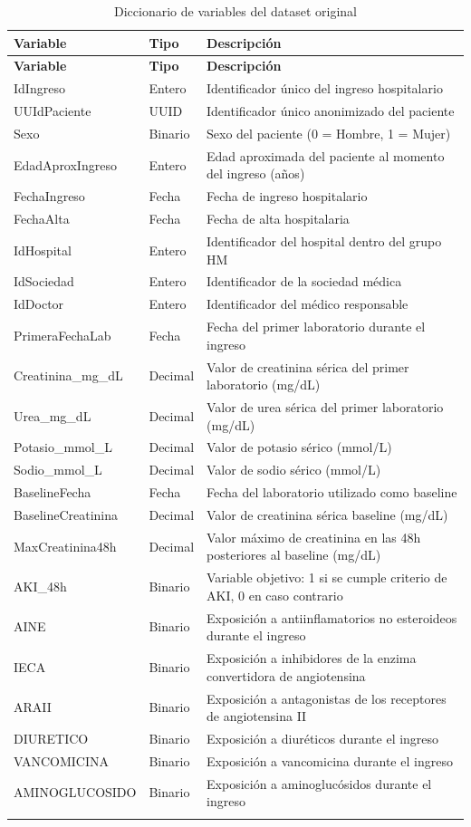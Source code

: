 \documentclass[12pt, a4paper, oneside]{report}
\begin{document}
\begin{longtable}{p{4cm}p{2.5cm}p{7cm}}
\hline
\textbf{Variable} & \textbf{Tipo} & \textbf{Descripción} \\
\hline
\endfirsthead
\hline
\textbf{Variable} & \textbf{Tipo} & \textbf{Descripción} \\
\hline
\endhead
\hline
\endfoot
IdIngreso & Entero & Identificador único del ingreso hospitalario \\
UUIdPaciente & UUID & Identificador único anonimizado del paciente \\
Sexo & Binario & Sexo del paciente (0 = Hombre, 1 = Mujer) \\
EdadAproxIngreso & Entero & Edad aproximada del paciente al momento del ingreso (años) \\
FechaIngreso & Fecha & Fecha de ingreso hospitalario \\
FechaAlta & Fecha & Fecha de alta hospitalaria \\
IdHospital & Entero & Identificador del hospital dentro del grupo HM \\
IdSociedad & Entero & Identificador de la sociedad médica \\
IdDoctor & Entero & Identificador del médico responsable \\
PrimeraFechaLab & Fecha & Fecha del primer laboratorio durante el ingreso \\
Creatinina\_mg\_dL & Decimal & Valor de creatinina sérica del primer laboratorio (mg/dL) \\
Urea\_mg\_dL & Decimal & Valor de urea sérica del primer laboratorio (mg/dL) \\
Potasio\_mmol\_L & Decimal & Valor de potasio sérico (mmol/L) \\
Sodio\_mmol\_L & Decimal & Valor de sodio sérico (mmol/L) \\
BaselineFecha & Fecha & Fecha del laboratorio utilizado como baseline \\
BaselineCreatinina & Decimal & Valor de creatinina sérica baseline (mg/dL) \\
MaxCreatinina48h & Decimal & Valor máximo de creatinina en las 48h posteriores al baseline (mg/dL) \\
AKI\_48h & Binario & Variable objetivo: 1 si se cumple criterio de AKI, 0 en caso contrario \\
AINE & Binario & Exposición a antiinflamatorios no esteroideos durante el ingreso \\
IECA & Binario & Exposición a inhibidores de la enzima convertidora de angiotensina \\
ARAII & Binario & Exposición a antagonistas de los receptores de angiotensina II \\
DIURETICO & Binario & Exposición a diuréticos durante el ingreso \\
VANCOMICINA & Binario & Exposición a vancomicina durante el ingreso \\
AMINOGLUCOSIDO & Binario & Exposición a aminoglucósidos durante el ingreso \\
\hline
\caption{Diccionario de variables del dataset original}
\label{tab:diccionario_original}
\end{longtable}
\end{document}
